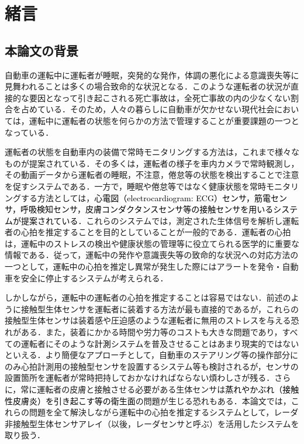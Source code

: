 \chapter{緒言}
\label{chap:intro}

\section{本論文の背景}
自動車の運転中に運転者が睡眠，突発的な発作，体調の悪化による意識喪失等に見舞われることは多くの場合致命的な状況となる．このような運転者の状況が直接的な要因となって引き起こされる死亡事故は，全死亡事故の内の少なくない割合を占めている．そのため，人々の暮らしに自動車が欠かせない現代社会においては，運転中に運転者の状態を何らかの方法で管理することが重要課題の一つとなっている．

運転者の状態を自動車内の装備で常時モニタリングする方法は，これまで様々なものが提案されている\cite{sensorreview}．その多くは，運転者の様子を車内カメラで常時観測し，その動画データから運転者の睡眠，不注意，倦怠等の状態を検出することで注意を促すシステムである\cite{system1, system2, system3}．一方で，睡眠や倦怠等ではなく健康状態を常時モニタリングする方法としては，\textcolor{black}{心電図（electrocardiogram: ECG）センサ，筋電センサ，呼吸検知センサ，皮膚コンダクタンスセンサ等の接触センサを用いるシステムが提案されている}\cite{contactsensor1, contactsensor2}．これらのシステムでは，測定された生体信号を解析し運転者の心拍を推定することを目的としていることが一般的である．運転者の心拍は，運転中のストレスの検出や健康状態の管理等に役立てられる医学的に重要な情報である．従って，運転中の発作や意識喪失等の致命的な状況への対応方法の一つとして，運転中の心拍を推定し異常が発生した際にはアラートを発令・自動車を安全に停止するシステムが考えられる．

しかしながら，運転中の運転者の心拍を推定することは容易ではない．前述のように接触型生体センサを運転者に装着する方法が最も直接的であるが，これらの接触型生体センサは装着感や圧迫感のような運転者に無用のストレスを与える恐れがある．また，装着にかかる時間や労力等のコストも大きな問題であり，すべての運転者にそのような\textcolor{black}{計測}システムを普及させることはあまり現実的ではないといえる．より簡便なアプローチとして，自動車のステアリング等の操作部分にのみ心拍計測用の接触型センサを設置するシステム\cite{eazyap1, eazyap2, eazyap3}等も検討されるが，センサの設置箇所を運転者が常時把持しておかなければならない煩わしさが残る．さらに，常に運転者の皮膚と接触させる必要がある生体センサは\textcolor{black}{蒸れやかぶれ（接触性皮膚炎）を引き起こす等の衛生面}の問題が生じる恐れもある．本論文では，これらの問題を全て解決しながら運転中の心拍を推定するシステムとして，レーダ非接触型生体センサアレイ（以後，レーダセンサと呼ぶ）を活用したシステムを取り扱う．

